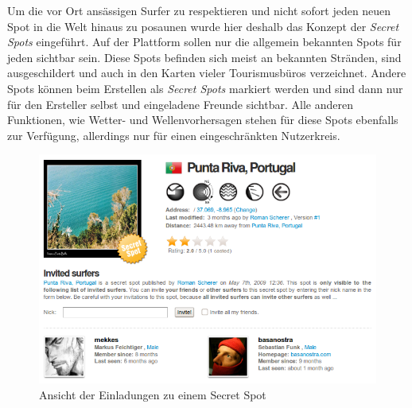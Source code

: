 Um die vor Ort ansässigen Surfer zu respektieren und nicht sofort
jeden neuen Spot in die Welt hinaus zu posaunen wurde hier deshalb das
Konzept der \textit{Secret Spots} eingeführt. Auf der Plattform sollen
nur die allgemein bekannten Spots für jeden sichtbar sein. Diese Spots
befinden sich meist an bekannten Stränden, sind ausgeschildert und
auch in den Karten vieler Tourismusbüros verzeichnet. Andere Spots
können beim Erstellen als \textit{Secret Spots} markiert werden und
sind dann nur für den Ersteller selbst und eingeladene Freunde
sichtbar. Alle anderen Funktionen, wie Wetter- und Wellenvorhersagen
stehen für diese Spots ebenfalls zur Verfügung, allerdings nur für
einen eingeschränkten Nutzerkreis.

\begin{figure}[t]
 \includegraphics[width=\textwidth]{bilder/secret-spot}
 \caption{Ansicht der Einladungen zu einem Secret Spot}
 \label{secret-spot}
\end{figure}


